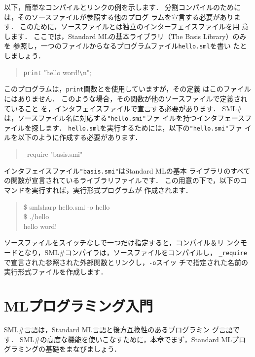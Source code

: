 \documentclass{jbook}
\newcommand{\smlsharp}{SML\#}
\begin{document}
	以下，簡単なコンパイルとリンクの例を示します．
	分割コンパイルのためには，そのソースファイルが参照する他のプログ
ラムを宣言する必要があります．
	このために，ソースファイルとは独立のインターフェイスファイルを用
意します．
	ここでは，Standard MLの基本ライブラリ（The Basis Library）のみを
参照し，一つのファイルからなるプログラムファイル{\tt hello.sml}を書い
たとしましょう．
\begin{tt}
\begin{quote}
\verb|print| "hello word!\verb|\|n";
\end{quote}
\end{tt}
	このプログラムは，{\tt print}関数とを使用していますが，その定義
はこのファイルにはありません．
	このような場合，その関数が他のソースファイルで定義されていること
を，インタフェイスファイルで宣言する必要があります．
	\smlsharp{}は，ソースファイル名に対応する{\tt "hello.smi"}ファ
イルを持つインタフェースファイルを探します．
	{\tt hello.sml}を実行するためには，以下の{\tt "hello.smi"}ファ
イルを以下のように作成する必要があります．
\begin{tt}
\begin{quote}
\verb|_|require "basis.smi"
\end{quote}
\end{tt}
	インタフェイスファイル{\tt "basis.smi"}はStandard MLの基本
ライブラリのすべての関数が宣言されているライブラリファイルです．
	この用意の下で，以下のコマンドを実行すれば，実行形式プログラムが
作成されます．
\begin{tt}
\begin{quote}
\$ smlsharp hello.sml -o hello\\
\$ ./hello\\
hello word!\\
\end{quote}
\end{tt}
	ソースファイルをスイッチなしで一つだけ指定すると，コンパイル＆リ
ンクモードとなり，\smlsharp{}コンパイラは，ソースファイルをコンパイルし，
\verb|_require|で宣言された参照された外部関数とリンクし，\verb|-o|スイッ
チで指定された名前の実行形式ファイルを作成します．


\chapter{MLプログラミング入門}
\label{chap:tutorialMlprogramming}

	\smlsharp{}言語は，Standard ML言語と後方互換性のあるプログラミン
グ言語です．
	\smlsharp{}の高度な機能を使いこなすために，本章でまず，Standard
MLプログラミングの基礎をまなびましょう．
\end{document}
